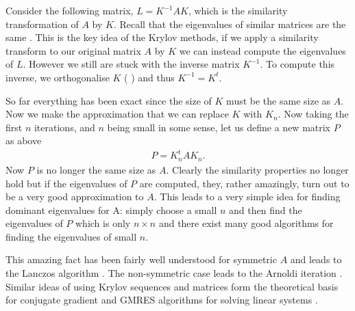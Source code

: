 Consider the following matrix, $L=K^{-1}AK$, which is the similarity transformation of $A$ by $K$. Recall that the eigenvalues of similar matrices are the same \cite{MeyerLinAlg}. This is the key idea of the Krylov methods, if we apply a similarity transform to our original matrix $A$ by $K$ we can instead compute the eigenvalues of $L$. However we still are stuck with the inverse matrix $K^{-1}$. To compute this inverse, we orthogonalise $K$ ( ) and thus $K^{-1}=K^{t}$. 

So far everything has been exact since the size of $K$ must be the same size as $A$. Now we make the approximation that we can replace $K$ with $K_{n}$. Now taking the first $n$ iterations, and $n$ being small in some sense, let us define a new matrix $P$ as above
\begin{align}
P=K_{n}^{t}AK_{n}.
\end{align}
Now $P$ is no longer the same size as $A$. Clearly the similarity properties no longer hold but if the eigenvalues of $P$ are computed, they, rather amazingly, turn out to be a very good approximation to $A$. This leads to a very simple idea for finding dominant eigenvalues for A: simply choose a small $n$ and then find the eigenvalues of $P$ which is only $n\times n$ and there exist many good algorithms for finding the eigenvalues of small $n$. 

This amazing fact has been fairly well understood for symmetric $A$ and leads to the Lanczos algorithm \cite{MeyerLinAlg}. The non-symmetric case leads to the Arnoldi iteration \cite{MeyerLinAlg}. Similar ideas of using Krylov sequences and matrices form the theoretical basis for conjugate gradient and GMRES algorithms for solving linear systems \cite{watkins2007matrix}.


